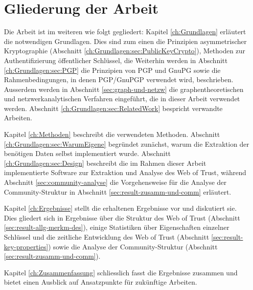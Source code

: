 \section{Gliederung der Arbeit}
\label{ch:Einleitung:sec:Gliederung}

Die Arbeit ist im weiteren wie folgt gegliedert: Kapitel
\ref{ch:Grundlagen} erl\"autert die notwendigen Grundlagen. Dies sind
zum einen die Prinzipien asymmetrischer Kryptographie (Abschnitt
\ref{ch:Grundlagen:sec:PublicKeyCrypto}), Methoden zur
Authentifizierung \"offentlicher Schl\"ussel, die Weiterhin werden in
Abschnitt \ref{ch:Grundlagen:sec:PGP} die Prinzipien von PGP und GnuPG
sowie die Rahmenbedingungen, in denen PGP/GnuPGP verwendet wird,
beschrieben. Ausserdem werden in Abschnitt \ref{sec:graph-und-netzw}
die graphentheoretischen und netzwerkanalytischen Verfahren
eingef\"uhrt, die in dieser Arbeit verwendet werden. Abschnitt
\ref{ch:Grundlagen:sec:RelatedWork} bespricht verwandte Arbeiten.

Kapitel \ref{ch:Methoden} beschreibt die verwendeten
Methoden. Abschnitt \ref{ch:Grundlagen:sec:WarumEigene} begr\"undet
zun\"achst, warum die Extraktion der ben\"otigen Daten selbst
implementiert wurde. Abschnitt \ref{ch:Grundlagen:sec:Design} beschreibt die
im Rahmen dieser Arbeit implementierte Software zur Extraktion und
Analyse des Web of Trust, w\"ahrend Abschnitt
\ref{sec:community-analyse} die Vorgehensweise f\"ur die Analyse der
Community-Struktur in Abschnitt \ref{sec:result-zusamm-und-comm}
erl\"autert.

Kapitel \ref{ch:Ergebnisse} stellt die erhaltenen Ergebnisse vor und
diskutiert sie. Dies gliedert sich in Ergebnisse \"uber die Struktur
des Web of Trust (Abschnitt \ref{sec:result-allg-merkm-des}), einige
Statistiken \"uber Eigenschaften einzelner Schl\"ussel und die
zeitliche Entwicklung des Web of Trust (Abschnitt
\ref{sec:result-key-properties}) sowie die Analyse der
Community-Struktur (Abschnitt \ref{sec:result-zusamm-und-comm}).

Kapitel \ref{ch:Zusammenfassung} schliesslich fasst die Ergebnisse
zusammen und bietet einen Ausblick auf Ansatzpunkte f\"ur zuk\"unftige
Arbeiten.

